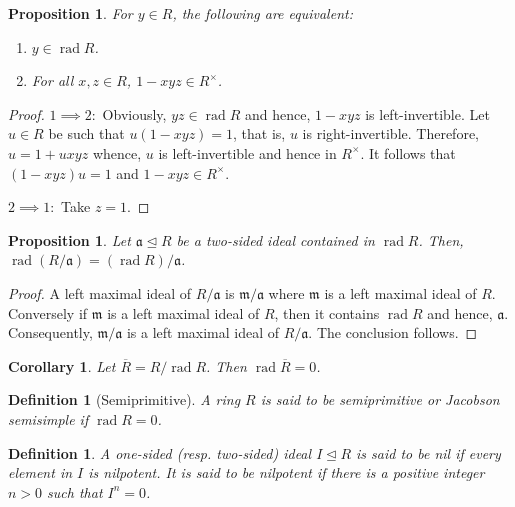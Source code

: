 \documentclass[12pt]{article}
\theoremstyle{thmstyle}
\newtheorem{proposition}[theorem]{Proposition}
\theoremstyle{defstyle}
\newtheorem{definition}[theorem]{Definition}
\newtheorem*{corollary}{Corollary}
\newcommand{\fraka}{\mathfrak{a}} %
\newcommand{\frakm}{\mathfrak{m}} %
\newcommand{\rad}{\operatorname{rad}}
\begin{document}
\begin{proposition}
    For $y\in R$, the following are equivalent: 
    \begin{enumerate}[label=(\arabic*)]
        \item $y\in\rad R$. 
        \item For all $x,z\in R$, $1 - xyz\in R^\times$.
    \end{enumerate}
\end{proposition}
\begin{proof}
    $1\implies 2:$ Obviously, $yz\in\rad R$ and hence, $1 - xyz$ is left-invertible. Let $u\in R$ be such that $u(1 - xyz) = 1$, that is, $u$ is right-invertible. Therefore, $u = 1 + uxyz$ whence, $u$ is left-invertible and hence in $R^\times$. It follows that $(1 - xyz)u = 1$ and $1 - xyz\in R^\times$.

    $2\implies 1:$ Take $z = 1$.
\end{proof}

\begin{proposition}
    Let $\fraka\unlhd R$ be a two-sided ideal contained in $\rad R$. Then, $\rad(R/\fraka) = (\rad R)/\fraka$.
\end{proposition}
\begin{proof}
    A left maximal ideal of $R/\fraka$ is $\frakm/\fraka$ where $\frakm$ is a left maximal ideal of $R$. Conversely if $\frakm$ is a left maximal ideal of $R$, then it contains $\rad R$ and hence, $\fraka$. Consequently, $\frakm/\fraka$ is a left maximal ideal of $R/\fraka$. The conclusion follows.
\end{proof}

\begin{corollary}
    Let $\overline R = R/\rad R$. Then $\rad\overline R = 0$.
\end{corollary}


\begin{definition}[Semiprimitive]
    A ring $R$ is said to be \emph{semiprimitive} or \emph{Jacobson semisimple} if $\rad R = 0$.
\end{definition}

\begin{definition}
    A one-sided (resp. two-sided) ideal $I\unlhd R$ is said to be \emph{nil} if every element in $I$ is nilpotent. It is said to be \emph{nilpotent} if there is a positive integer $n > 0$ such that $I^n = 0$.
\end{definition}
\end{document}
